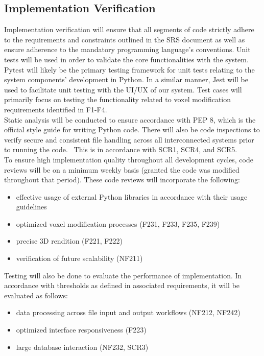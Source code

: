 \documentclass[12pt, titlepage]{article}
\begin{document}
\subsection{Implementation Verification}

Implementation verification will ensure that all segments of code strictly adhere to the requirements and constraints outlined in the SRS document as well as ensure adherence to the mandatory programming language’s conventions. Unit tests will be used in order to validate the core functionalities with the system. Pytest will likely be the primary testing framework for unit tests relating to the system components' development in Python. In a similar manner, Jest will be used to facilitate unit testing with the UI/UX of our system. Test cases will primarily focus on testing the functionality related to voxel modification requirements identified in F1-F4.\\

\noindent Static analysis will be conducted to ensure accordance with PEP 8, which is the official style guide for writing Python code. There will also be code inspections to verify secure and consistent file handling across all interconnected systems prior to running the code.  This is in accordance with SCR1, SCR4, and SCR5.\\

\noindent To ensure high implementation quality throughout all development cycles, code reviews will be on a minimum weekly basis (granted the code was modified throughout that period). These code reviews will incorporate the following:
\begin{itemize}
\item effective usage of external Python libraries in accordance with their usage guidelines
\item optimized voxel modification processes (F231, F233, F235, F239)
\item precise 3D rendition (F221, F222)
\item verification of future scalability (NF211)
\end{itemize}

\noindent Testing will also be done to evaluate the performance of implementation. In accordance with thresholds as defined in associated requirements, it will be evaluated as follows:
\begin{itemize}
\item data processing across file input and output workflows (NF212, NF242)
\item optimized interface responsiveness (F223)
\item large database interaction (NF232, SCR3)
\end{itemize}
\end{document}
